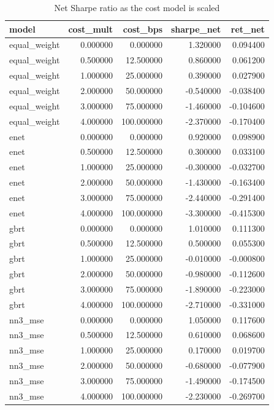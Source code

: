\begin{table}
\caption{Net Sharpe ratio as the cost model is scaled}
\label{tab:t7_cost_sensitivity}
\begin{tabular}{lrrrr}
\toprule
model & cost\_mult & cost\_bps & sharpe\_net & ret\_net \\
\midrule
equal\_weight & 0.000000 & 0.000000 & 1.320000 & 0.094400 \\
equal\_weight & 0.500000 & 12.500000 & 0.860000 & 0.061200 \\
equal\_weight & 1.000000 & 25.000000 & 0.390000 & 0.027900 \\
equal\_weight & 2.000000 & 50.000000 & -0.540000 & -0.038400 \\
equal\_weight & 3.000000 & 75.000000 & -1.460000 & -0.104600 \\
equal\_weight & 4.000000 & 100.000000 & -2.370000 & -0.170400 \\
enet & 0.000000 & 0.000000 & 0.920000 & 0.098900 \\
enet & 0.500000 & 12.500000 & 0.300000 & 0.033100 \\
enet & 1.000000 & 25.000000 & -0.300000 & -0.032700 \\
enet & 2.000000 & 50.000000 & -1.430000 & -0.163400 \\
enet & 3.000000 & 75.000000 & -2.440000 & -0.291400 \\
enet & 4.000000 & 100.000000 & -3.300000 & -0.415300 \\
gbrt & 0.000000 & 0.000000 & 1.010000 & 0.111300 \\
gbrt & 0.500000 & 12.500000 & 0.500000 & 0.055300 \\
gbrt & 1.000000 & 25.000000 & -0.010000 & -0.000800 \\
gbrt & 2.000000 & 50.000000 & -0.980000 & -0.112600 \\
gbrt & 3.000000 & 75.000000 & -1.890000 & -0.223000 \\
gbrt & 4.000000 & 100.000000 & -2.710000 & -0.331000 \\
nn3\_mse & 0.000000 & 0.000000 & 1.050000 & 0.117600 \\
nn3\_mse & 0.500000 & 12.500000 & 0.610000 & 0.068600 \\
nn3\_mse & 1.000000 & 25.000000 & 0.170000 & 0.019700 \\
nn3\_mse & 2.000000 & 50.000000 & -0.680000 & -0.077900 \\
nn3\_mse & 3.000000 & 75.000000 & -1.490000 & -0.174500 \\
nn3\_mse & 4.000000 & 100.000000 & -2.230000 & -0.269700 \\

\end{tabular}
\end{table}
